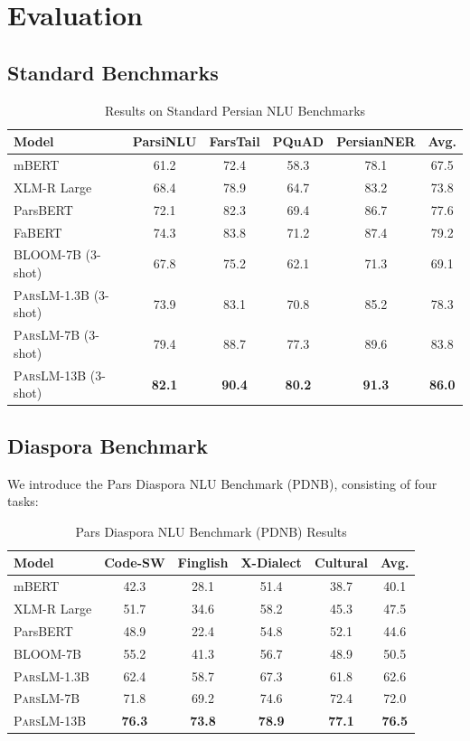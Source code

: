 \documentclass[11pt,a4paper]{article}
\newcommand{\parslm}{\textsc{ParsLM}\xspace}
\begin{document}
\section{Evaluation}

\subsection{Standard Benchmarks}

\begin{table}[H]
\centering
\caption{Results on Standard Persian NLU Benchmarks}
\label{tab:standard-bench}
\begin{tabular}{lccccc}
\toprule
\textbf{Model} & \textbf{ParsiNLU} & \textbf{FarsTail} & \textbf{PQuAD} & \textbf{PersianNER} & \textbf{Avg.} \\
\midrule
mBERT & 61.2 & 72.4 & 58.3 & 78.1 & 67.5 \\
XLM-R Large & 68.4 & 78.9 & 64.7 & 83.2 & 73.8 \\
ParsBERT & 72.1 & 82.3 & 69.4 & 86.7 & 77.6 \\
FaBERT & 74.3 & 83.8 & 71.2 & 87.4 & 79.2 \\
BLOOM-7B (3-shot) & 67.8 & 75.2 & 62.1 & 71.3 & 69.1 \\
\midrule
\parslm-1.3B (3-shot) & 73.9 & 83.1 & 70.8 & 85.2 & 78.3 \\
\parslm-7B (3-shot) & 79.4 & 88.7 & 77.3 & 89.6 & 83.8 \\
\parslm-13B (3-shot) & \textbf{82.1} & \textbf{90.4} & \textbf{80.2} & \textbf{91.3} & \textbf{86.0} \\
\bottomrule
\end{tabular}
\end{table}

\subsection{Diaspora Benchmark}

We introduce the Pars Diaspora NLU Benchmark (PDNB), consisting of four tasks:

\begin{table}[H]
\centering
\caption{Pars Diaspora NLU Benchmark (PDNB) Results}
\label{tab:pdnb}
\begin{tabular}{lcccc|c}
\toprule
\textbf{Model} & \textbf{Code-SW} & \textbf{Finglish} & \textbf{X-Dialect} & \textbf{Cultural} & \textbf{Avg.} \\
\midrule
mBERT & 42.3 & 28.1 & 51.4 & 38.7 & 40.1 \\
XLM-R Large & 51.7 & 34.6 & 58.2 & 45.3 & 47.5 \\
ParsBERT & 48.9 & 22.4 & 54.8 & 52.1 & 44.6 \\
BLOOM-7B & 55.2 & 41.3 & 56.7 & 48.9 & 50.5 \\
\midrule
\parslm-1.3B & 62.4 & 58.7 & 67.3 & 61.8 & 62.6 \\
\parslm-7B & 71.8 & 69.2 & 74.6 & 72.4 & 72.0 \\
\parslm-13B & \textbf{76.3} & \textbf{73.8} & \textbf{78.9} & \textbf{77.1} & \textbf{76.5} \\
\bottomrule
\end{tabular}
\end{table}
\end{document}

